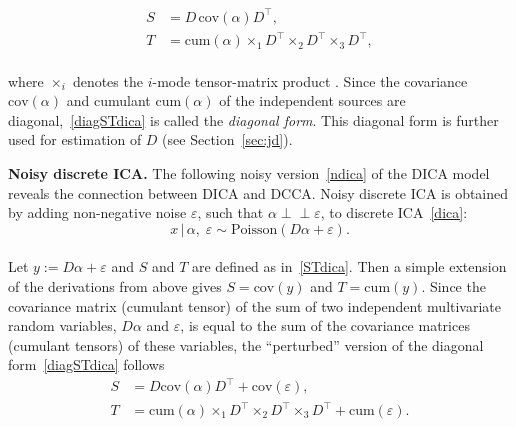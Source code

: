 \documentclass{article}
\newcommand{\ppp}{\textbf}
\newcommand{\Rra}[1]{\left(#1\right)}
\newcommand{\cov}{\mathrm{cov}}
\newcommand{\cum}{\mathrm{cum}}
\newcommand{\poi}{\mathrm{Poisson}}
\newcommand{\ci}{\perp\!\!\!\perp}
\begin{document}
\begin{equation}\label{diagSTdica}
\begin{aligned}
S&=D\,\cov(\alpha)D^{\top}, \\
T&= \cum(\alpha) \times_1 D^{\top} \times_2 D^{\top} \times_3 D^{\top},
\end{aligned}
\end{equation}
\\[-0.8em]
where $\times_i$ denotes the $i$-mode tensor-matrix product
\citep[see, e.g.,][]{KolBad2009}.
Since the covariance $\cov(\alpha)$ and cumulant $\cum(\alpha)$ of the independent sources are diagonal,~\eqref{diagSTdica} is called
the \emph{diagonal form}.  
This diagonal form is further used for estimation of $D$ (see Section~\ref{sec:jd}).




\ppp{Noisy discrete ICA.}
The following noisy version~\eqref{ndica} of the DICA model reveals the connection between DICA and DCCA. 
Noisy discrete ICA is obtained by adding non-negative noise $\varepsilon$, such that $\alpha \ci \varepsilon$, to discrete ICA~\eqref{dica}:
\\[-0.8em]
\begin{equation}\label{ndica}
x\,|\,\alpha,\;\varepsilon \sim \poi\Rra{ D\alpha + \varepsilon}.
\end{equation}
\\[-1.2em]
Let $y:=D\alpha+\varepsilon$ and $S$ and $T$ are defined as in~\eqref{STdica}.
Then a simple extension of the derivations from above gives $S= \cov(y)$ and $T=\cum(y)$.
Since the covariance matrix (cumulant tensor) of the sum of two independent multivariate random variables, $D\alpha$ and $\varepsilon$, is equal to the sum of the covariance matrices (cumulant tensors) of these variables, the ``perturbed'' version of the diagonal form~\eqref{diagSTdica} follows
\\[-1.4em]
\begin{equation}\label{diagSTndica}
\begin{aligned}
S &= D\cov(\alpha) D^{\top} + \cov(\varepsilon), \\
T &= \cum(\alpha) \times_1 D^{\top} \times_2 D^{\top} \times_3 D^{\top} + \cum(\varepsilon).
\end{aligned}
\end{equation}
\\[-1.9em]
\end{document}
